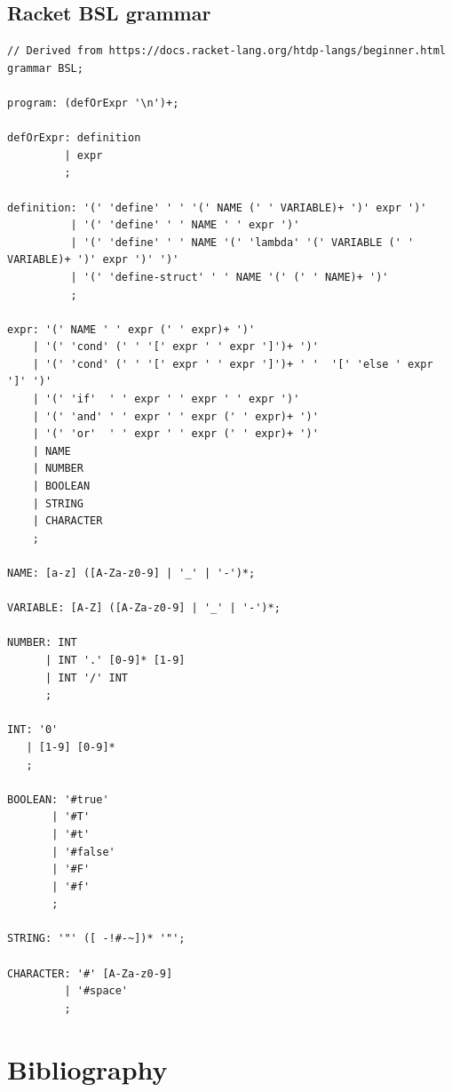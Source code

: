 \documentclass[]{usiinfbachelorproject}
\begin{document}
\newpage

\subsection*{Racket BSL grammar}

\begin{lstlisting}[caption={BSL.g4},
                   label={lst:app-grammar-bsl},
                   style=antlr]
// Derived from https://docs.racket-lang.org/htdp-langs/beginner.html
grammar BSL;

program: (defOrExpr '\n')+;

defOrExpr: definition
         | expr
         ;

definition: '(' 'define' ' ' '(' NAME (' ' VARIABLE)+ ')' expr ')'
          | '(' 'define' ' ' NAME ' ' expr ')'
          | '(' 'define' ' ' NAME '(' 'lambda' '(' VARIABLE (' ' VARIABLE)+ ')' expr ')' ')'
          | '(' 'define-struct' ' ' NAME '(' (' ' NAME)+ ')'
          ;

expr: '(' NAME ' ' expr (' ' expr)+ ')'
    | '(' 'cond' (' ' '[' expr ' ' expr ']')+ ')'
    | '(' 'cond' (' ' '[' expr ' ' expr ']')+ ' '  '[' 'else ' expr ']' ')'
    | '(' 'if'  ' ' expr ' ' expr ' ' expr ')'
    | '(' 'and' ' ' expr ' ' expr (' ' expr)+ ')'
    | '(' 'or'  ' ' expr ' ' expr (' ' expr)+ ')'
    | NAME
    | NUMBER
    | BOOLEAN
    | STRING
    | CHARACTER
    ;

NAME: [a-z] ([A-Za-z0-9] | '_' | '-')*;

VARIABLE: [A-Z] ([A-Za-z0-9] | '_' | '-')*;

NUMBER: INT
      | INT '.' [0-9]* [1-9]
      | INT '/' INT
      ;

INT: '0'
   | [1-9] [0-9]*
   ;

BOOLEAN: '#true'
       | '#T'
       | '#t'
       | '#false'
       | '#F'
       | '#f'
       ;

STRING: '"' ([ -!#-~])* '"';

CHARACTER: '#' [A-Za-z0-9]
         | '#space'
         ;
\end{lstlisting}

\newpage

\section{Bibliography}



\end{document}
